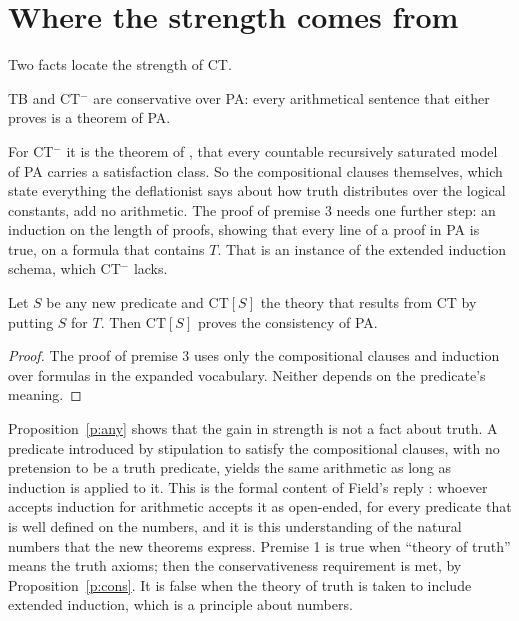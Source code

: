 \documentclass{situationist-preprint}
\begin{document}
\section{Where the strength comes from}

Two facts locate the strength of CT.

\begin{proposition}\label{p:cons}
TB and CT$^-$ are conservative over PA: every arithmetical sentence that either proves is a theorem of PA.
\end{proposition}

For CT$^-$ it is the theorem of \citet{KKL1981}, that every countable recursively saturated model of PA carries a satisfaction class. So the compositional clauses themselves, which state everything the deflationist says about how truth distributes over the logical constants, add no arithmetic. The proof of premise 3 needs one further step: an induction on the length of proofs, showing that every line of a proof in PA is true, on a formula that contains $T$. That is an instance of the extended induction schema, which CT$^-$ lacks.

\begin{proposition}\label{p:any}
Let $S$ be any new predicate and CT$[S]$ the theory that results from CT by putting $S$ for $T$. Then CT$[S]$ proves the consistency of PA.
\end{proposition}

\begin{proof}
The proof of premise 3 uses only the compositional clauses and induction over formulas in the expanded vocabulary. Neither depends on the predicate's meaning.
\end{proof}

Proposition~\ref{p:any} shows that the gain in strength is not a fact about truth. A predicate introduced by stipulation to satisfy the compositional clauses, with no pretension to be a truth predicate, yields the same arithmetic as long as induction is applied to it. This is the formal content of Field's reply \citep{Field1999}: whoever accepts induction for arithmetic accepts it as open-ended, for every predicate that is well defined on the numbers, and it is this understanding of the natural numbers that the new theorems express. Premise 1 is true when \enquote{theory of truth} means the truth axioms; then the conservativeness requirement is met, by Proposition~\ref{p:cons}. It is false when the theory of truth is taken to include extended induction, which is a principle about numbers.
\end{document}
